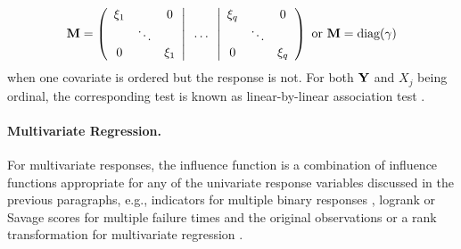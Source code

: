 \begin{eqnarray*}
\M = 
\left( 
    \begin{array}{ccc}
        \xi_1 &          & 0     \\
              &  \ddots  &       \\
          0   &          & \xi_1 
    \end{array} \right| 
    \begin{array}{c}
         \\
      \hdots \\
          \\
    \end{array} %
\left|
    \begin{array}{ccc}
        \xi_q &          & 0     \\
              &  \ddots  &       \\
          0   &          & \xi_q 
    \end{array} 
\right) 
\text{ or } %
\M = \text{diag}(\gamma)
\end{eqnarray*}
when one covariate is ordered but the response is not. For both $\mathbf{Y}$ and $X_j$
being ordinal, the corresponding test is known as linear-by-linear association
test \citep{Agresti2002}. 

\paragraph{Multivariate Regression.}
For multivariate responses, the influence function is a combination of
influence functions appropriate for any of the univariate response variables
discussed in the previous paragraphs, e.g., indicators for multiple binary
responses \citep{Zhang1998,NohSongPark2004}, logrank or Savage scores
for multiple failure times 
and the original observations or a rank transformation for multivariate regression 
\citep{Death2002}.
